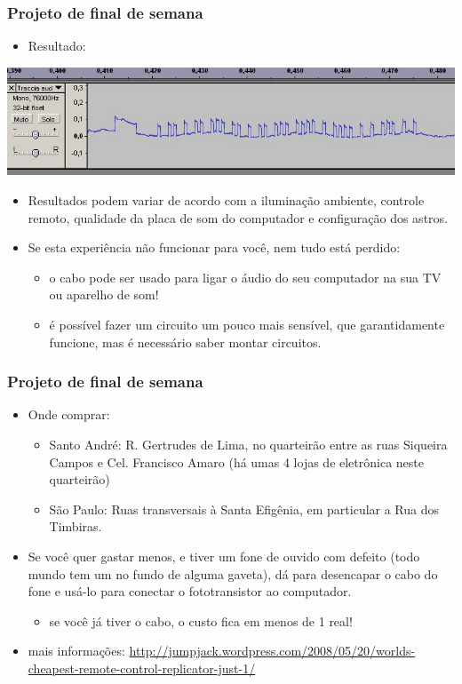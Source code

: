 \documentclass{beamer}
\begin{document}
\begin{frame}
\frametitle{Projeto de final de semana}

\begin{itemize}
\item Resultado:
\end{itemize}
\includegraphics[width=\textwidth]{images/remote-dvd-lg-rh255-PLAY-wav-76000Hz}

\begin{itemize}
\item Resultados podem variar de acordo com a iluminação
ambiente, controle remoto, qualidade da placa de som do computador e
configuração dos astros.
\item Se esta experiência não funcionar para você, nem tudo está perdido:
\begin{itemize}
\item o cabo pode ser usado para ligar o áudio do seu computador na sua
TV ou aparelho de som!
\item é possível fazer um circuito um pouco mais sensível, que garantidamente
funcione, mas é necessário saber montar circuitos.
\end{itemize}
\end{itemize}

\end{frame}


\begin{frame}
\frametitle{Projeto de final de semana}

\begin{itemize}
\item Onde comprar:
\begin{itemize}
\item Santo André: R. Gertrudes de Lima, no quarteirão entre as ruas
      Siqueira Campos e Cel. Francisco Amaro (há umas 4 lojas de eletrônica
      neste quarteirão)
\item São Paulo: Ruas transversais à Santa Efigênia, em particular a
      Rua dos Timbiras.
\end{itemize}
\item Se você quer gastar menos, e tiver um fone de ouvido com defeito
(todo mundo tem um no fundo de alguma gaveta), dá para desencapar o
cabo do fone e usá-lo para conectar o fototransistor ao computador.
\begin{itemize}
\item se você já tiver o cabo, o custo fica em menos de 1 real!
\end{itemize}
\item mais informações:
{\small
\url{http://jumpjack.wordpress.com/2008/05/20/worlds-cheapest-remote-control-replicator-just-1/}}
\end{itemize}
\end{frame}
\end{document}

